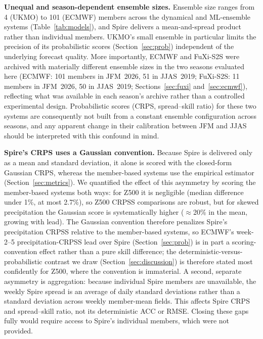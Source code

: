 \documentclass[11pt,a4paper]{article}
\begin{document}
\textbf{Unequal and season-dependent ensemble sizes.} Ensemble size ranges
from 4 (UKMO) to 101 (ECMWF) members across the dynamical and ML-ensemble
systems (Table~\ref{tab:models}), and Spire delivers a mean-and-spread
product rather than individual members. UKMO's small ensemble in particular
limits the precision of its probabilistic scores (Section~\ref{sec:prob})
independent of the underlying forecast quality. More importantly, ECMWF and
FuXi-S2S were archived with materially different ensemble sizes in the two
seasons evaluated here (ECMWF: 101 members in JFM~2026, 51 in JJAS~2019;
FuXi-S2S: 11 members in JFM~2026, 50 in JJAS~2019; Sections~\ref{sec:fuxi}
and~\ref{sec:ecmwf}), reflecting what was available in each season's archive
rather than a controlled experimental design. Probabilistic scores (CRPS,
spread--skill ratio) for these two systems are consequently not built from a
constant ensemble configuration across seasons, and any apparent change in
their calibration between JFM and JJAS should be interpreted with this
confound in mind.

\textbf{Spire's CRPS uses a Gaussian convention.} Because Spire is delivered
only as a mean and standard deviation, it alone is scored with the closed-form
Gaussian CRPS, whereas the member-based systems use the empirical estimator
(Section~\ref{sec:metrics}). We quantified the effect of this asymmetry by
scoring the member-based systems both ways: for Z500 it is negligible (median
difference under 1\%, at most 2.7\%), so Z500 CRPSS comparisons are robust, but
for skewed precipitation the Gaussian score is systematically higher
($\approx$20\% in the mean, growing with lead). The Gaussian convention
therefore penalizes Spire's precipitation CRPSS relative to the member-based
systems, so ECMWF's week-2--5 precipitation-CRPSS lead over Spire
(Section~\ref{sec:prob}) is in part a scoring-convention effect rather than a
pure skill difference; the deterministic-versus-probabilistic contrast we draw
(Section~\ref{sec:discussion}) is therefore stated most confidently for Z500,
where the convention is immaterial. A second, separate asymmetry is aggregation:
because individual Spire members are unavailable, the weekly Spire spread is an
average of daily standard deviations rather than a standard deviation across
weekly member-mean fields. This affects Spire CRPS and spread--skill ratio, not
its deterministic ACC or RMSE. Closing these gaps fully would require access to
Spire's individual members, which were not provided.
\end{document}
